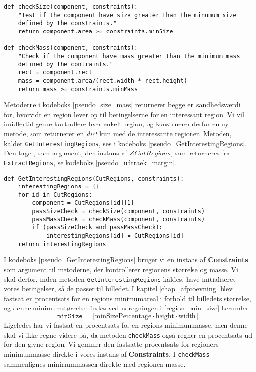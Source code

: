 {\begin{lstlisting}[caption={Metoder til at kontrollere en regions
    størrelse og masse.},captionpos=b,label={pseudo_size_mass},
    frame=tb, breaklines=false, float]
def checkSize(component, constraints):
    "Test if the component have size greater than the minumum size
    defined by the constraints."
    return component.area >= constraints.minSize

def checkMass(component, constraints):
    "Check if the component have mass greater than the minimum mass
    defined by the contraints."
    rect = component.rect
    mass = component.area/(rect.width * rect.height)
    return mass >= constraints.minMass
\end{lstlisting}

Metoderne i kodeboks \ref{pseudo_size_mass} returnerer begge en
sandhedsværdi for, hvorvidt en region lever op til betingelserne for en
interessant region. Vi vil imidlertid gerne kontrollere hver enkelt
region, og konstruerer derfor en ny metode, som returnerer en
\emph{dict} kun med de interessante regioner.  Metoden, kaldet
\texttt{GetInterestingRegions}, ses i kodeboks
\ref{pseudo_GetInterestingRegions}. Den tager, som argument, den instans
af $\angles{CutRegions}$, som returneres fra \texttt{ExtractRegions}, se
kodeboks \ref{pseudo_udtraek_margin}.

\begin{lstlisting}[caption={Metode, som kun returnerer de interessante
    regioner, givet en instans af $\angles{CutRegions}$.}, captionpos=b,
    label={pseudo_GetInterestingRegions}, frame=tb, breaklines=false,
    float]
def GetInterestingRegions(CutRegions, constraints):
    interestingRegions = {}
    for id in CutRegions:
        component = CutRegions[id][1]
        passSizeCheck = checkSize(component, constraints)
        passMassCheck = checkMass(component, constraints)
        if (passSizeCheck and passMassCheck):
            interestingRegions[id] = CutRegions[id]
    return interestingRegions
\end{lstlisting}

I kodeboks \ref{pseudo_GetInterestingRegions} bruger vi en instans af
\textbf{Constraints} som argument til metoderne, der kontrollerer
regionens størrelse og masse. Vi skal derfor, inden metoden
\texttt{GetInterestingRegions} kaldes, have initialiseret vores
betingelser, så de passer til billedet. I kapitel \ref{chap_afproevning}
blev fastsat en procentsats for en regions minimumareal i forhold til
billedets størrelse, og denne minimumstørrelse findes ved udregningen i
\eqref{region_min_size} herunder.
\begin{equation}
    \mathtt{minSize} =
    \lfloor
    \mathrm{minSizePercentage}\cdot\mathrm{height}\cdot\mathrm{width}
    \rfloor
    \label{region_min_size}
\end{equation}
Ligeledes har vi fastsat en procentsats for en regions minimummasse, men
denne skal vi ikke regne videre på, da metoden \texttt{checkMass} også
regner en procentsats ud for den givne region. Vi gemmer den fastsatte
procentsats for regioners minimummasse direkte i vores instans af
\textbf{Constraints}. I \texttt{checkMass} sammenlignes minimummassen
direkte med regionen masse.

}
